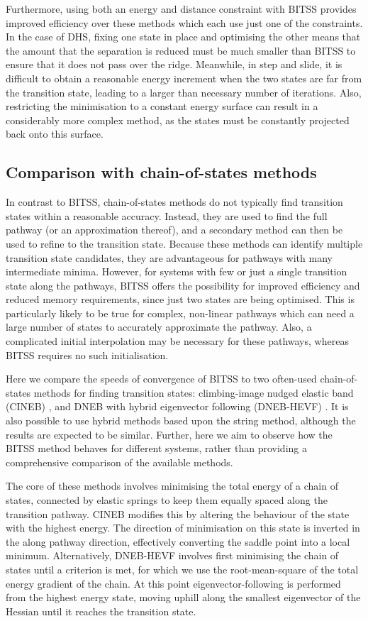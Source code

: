 \documentclass[aip,jcp,reprint,twocolumn]{revtex4-1}
\begin{document}
Furthermore, using both an energy and distance constraint with BITSS provides improved efficiency over these methods which each use just one of the constraints.
In the case of DHS, fixing one state in place and optimising the other means that the amount that the separation is reduced must be much smaller than BITSS to ensure that it does not pass over the ridge.
Meanwhile, in step and slide, it is difficult to obtain a reasonable energy increment when the two states are far from the transition state, leading to a larger than necessary number of iterations.
Also, restricting the minimisation to a constant energy surface can result in a considerably more complex method, as the states must be constantly projected back onto this surface.


\subsection{Comparison with chain-of-states methods}
In contrast to BITSS, chain-of-states methods do not typically find transition states within a reasonable accuracy.
Instead, they are used to find the full pathway (or an approximation thereof), and a secondary method can then be used to refine to the transition state.
Because these methods can identify multiple transition state candidates, they are advantageous for pathways with many intermediate minima.
However, for systems with few or just a single transition state along the pathways, BITSS offers the possibility for improved efficiency and reduced memory requirements, since just two states are being optimised.
This is particularly likely to be true for complex, non-linear pathways which can need a large number of states to accurately approximate the pathway.
Also, a complicated initial interpolation may be necessary for these pathways, whereas BITSS requires no such initialisation.

Here we compare the speeds of convergence of BITSS to two often-used chain-of-states methods for finding transition states: climbing-image nudged elastic band (CINEB) \cite{Henkelman2000a}, and DNEB with hybrid eigenvector following (DNEB-HEVF) \cite{Cerjan1981}.
It is also possible to use hybrid methods based upon the string method, although the results are expected to be similar.
Further, here we aim to observe how the BITSS method behaves for different systems, rather than providing a comprehensive comparison of the available methods.

The core of these methods involves minimising the total energy of a chain of states, connected by elastic springs to keep them equally spaced along the transition pathway.
CINEB modifies this by altering the behaviour of the state with the highest energy.
The direction of minimisation on this state is inverted in the along pathway direction, effectively converting the saddle point into a local minimum.
Alternatively, DNEB-HEVF involves first minimising the chain of states until a criterion is met, for which we use the root-mean-square of the total energy gradient of the chain. 
At this point eigenvector-following is performed from the highest energy state, moving uphill along the smallest eigenvector of the Hessian until it reaches the transition state.
\end{document}
